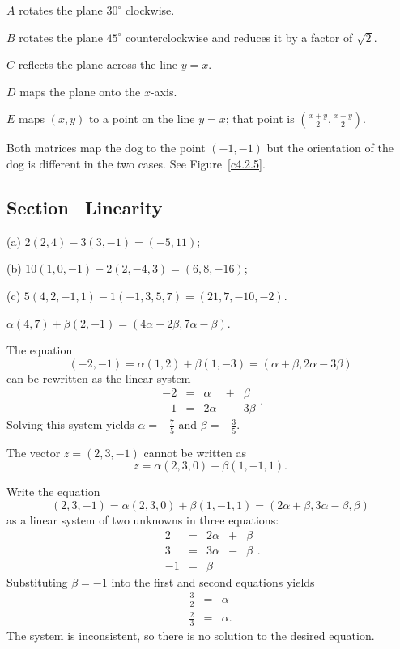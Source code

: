  $A$ rotates the plane $30^\circ$ clockwise.

 $B$ rotates the plane $45^\circ$ counterclockwise and
reduces it by a factor of $\sqrt{2}$.

 $C$ reflects the plane across the line $y = x$.

 $D$ maps the plane onto the $x$-axis.

 $E$ maps $(x,y)$ to a point on the line $y = x$; that
point is $(\frac{x + y}{2}, \frac{x + y}{2})$.


  Both matrices map the dog to the point $(-1,-1)$ but the
orientation of the dog is different in the two cases.  See 
Figure~\ref{c4.2.5}.
\begin{figure}[htb]
     \centerline{%
     }
\end{figure} 


\subsection*{Section~\protect{\ref{S:linearity}} Linearity}

(a) $2(2,4) - 3(3,-1) = (-5,11)$;

(b) $10(1,0,-1) - 2(2,-4,3) = (6,8,-16)$;

(c) $5(4,2,-1,1) - 1(-1,3,5,7) = (21,7,-10,-2)$.

$\alpha (4,7) + \beta (2,-1) = (4\alpha + 2\beta, 7\alpha - \beta)$.

The equation
\[ (-2, -1) = \alpha(1,2) + \beta(1,-3) =
(\alpha + \beta, 2\alpha - 3\beta ) \]
can be rewritten as the linear system
\[ \begin{array}{rrrrr}
-2 & = & \alpha & + & \beta \\
-1 & = & 2\alpha & - & 3\beta\end{array}. \]
Solving this system yields $\alpha = -\frac{7}{5}$ and
$\beta = -\frac{3}{5}$.

\ans The vector $z = (2,3,-1)$ cannot be written as
\[
z = \alpha(2,3,0) + \beta(1,-1,1).
\]

\soln Write the equation
\[ (2,3,-1) = \alpha(2,3,0) + \beta(1,-1,1) = 
(2\alpha + \beta, 3\alpha - \beta, \beta) \]
as a linear system of two unknowns in three equations:
\[ \begin{array}{rrrrr}
2 & = & 2\alpha & + & \beta \\
3 & = & 3\alpha & - & \beta \\
-1 & = & \beta \end{array}. \]
Substituting $\beta = -1$ into the first and second equations
yields
\[ \begin{array}{rcl}
\frac{3}{2} & = & \alpha \\
\frac{2}{3} & = & \alpha. \end{array} \]
The system is inconsistent, so there is no solution to the desired
equation.


